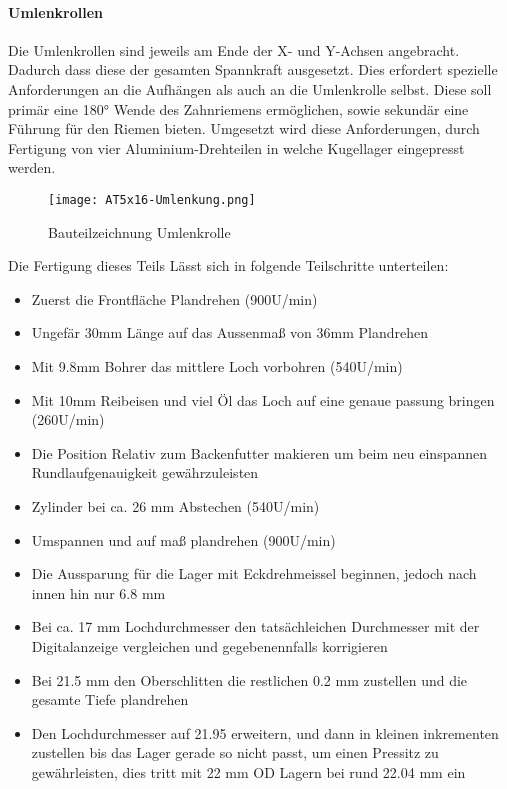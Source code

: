 \paragraph{Umlenkrollen}
Die Umlenkrollen sind jeweils am Ende der X- und Y-Achsen angebracht. Dadurch dass diese der gesamten Spannkraft ausgesetzt. Dies erfordert spezielle Anforderungen an die Aufhängen als auch an die Umlenkrolle selbst. Diese soll primär eine 180° Wende des Zahnriemens ermöglichen, sowie sekundär eine Führung für den Riemen bieten. 
Umgesetzt wird diese Anforderungen, durch Fertigung von vier Aluminium-Drehteilen in welche Kugellager eingepresst werden.

\begin{figure}[h]
    \texttt{[image: AT5x16-Umlenkung.png]}
    \centering
    \caption{Bauteilzeichnung Umlenkrolle}
\end{figure}

Die Fertigung dieses Teils Lässt sich in folgende Teilschritte unterteilen:
\begin{itemize}
    \setlength\itemsep{0mm}
    \item Zuerst die Frontfläche Plandrehen (900U/min)
    \item Ungefär 30mm Länge auf das Aussenmaß von 36mm Plandrehen
    \item Mit 9.8mm Bohrer das mittlere Loch vorbohren (540U/min)
    \item Mit 10mm Reibeisen und viel Öl das Loch auf eine genaue passung bringen (260U/min)
    \item Die Position Relativ zum Backenfutter makieren um beim neu einspannen Rundlaufgenauigkeit gewährzuleisten
    \item Zylinder bei ca. 26 mm Abstechen (540U/min)
    \item Umspannen und auf maß plandrehen (900U/min)
    \item Die Aussparung für die Lager mit Eckdrehmeissel beginnen, jedoch nach innen hin nur 6.8 mm 
    \item Bei ca. 17 mm Lochdurchmesser den tatsächleichen Durchmesser mit der Digitalanzeige vergleichen und gegebenennfalls korrigieren
    \item Bei 21.5 mm den Oberschlitten die restlichen 0.2 mm zustellen und die gesamte Tiefe plandrehen
    \item Den Lochdurchmesser auf 21.95 erweitern, und dann in kleinen inkrementen zustellen bis das Lager gerade so nicht passt, um einen Pressitz zu gewährleisten, dies tritt mit 22 mm OD Lagern bei rund 22.04 mm ein
\end{itemize}

